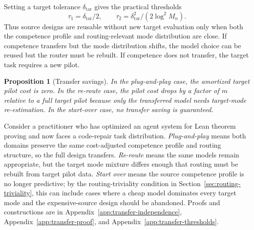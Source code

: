 \documentclass[twoside,11pt]{article}
\newtheorem{proposition}{Proposition}
\newcommand{\Mn}{M_n}
\newcommand{\appref}[1]{Appendix~\ref{#1}}
\newcommand{\secref}[1]{Section~\ref{#1}}
\begin{document}
Setting a target tolerance \(\delta_{\mathrm{tar}}\) gives the practical thresholds
\[
  \tau_1=\delta_{\mathrm{tar}}/2,
  \qquad
  \tau_2=\delta_{\mathrm{tar}}^2/(2\log^2\Mn).
\]
Thus source designs are reusable without new target evaluation only when both the competence profile and routing-relevant mode distribution are close.
If competence transfers but the mode distribution shifts, the model choice can be reused but the router must be rebuilt.
If competence does not transfer, the target task requires a new pilot.

\begin{proposition}[Transfer savings]
\label{prop:transfer-savings}
In the plug-and-play case, the amortized target pilot cost is zero.
In the re-route case, the pilot cost drops by a factor of \(m\) relative to a full target pilot because only the transferred model needs target-mode re-estimation.
In the start-over case, no transfer saving is guaranteed.
\end{proposition}

Consider a practitioner who has optimized an agent system for Lean theorem proving and now faces a code-repair task distribution.
\emph{Plug-and-play} means both domains preserve the same cost-adjusted competence profile and routing structure, so the full design transfers.
\emph{Re-route} means the same models remain appropriate, but the target mode mixture differs enough that routing must be rebuilt from target pilot data.
\emph{Start over} means the source competence profile is no longer predictive; by the routing-triviality condition in \secref{sec:routing-triviality}, this can include cases where a cheap model dominates every target mode and the expensive-source design should be abandoned.
Proofs and constructions are in \appref{app:transfer-independence}, \appref{app:transfer-proof}, and \appref{app:transfer-thresholds}.
\end{document}
